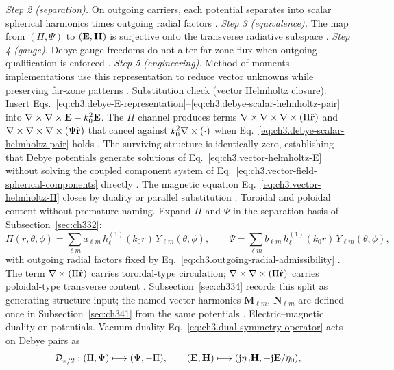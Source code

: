 \emph{Step 2 (separation).} On outgoing carriers, each potential separates into scalar spherical harmonics times outgoing radial factors .
\emph{Step 3 (equivalence).} The map from \((\Pi,\Psi)\) to \((\mathbf{E},\mathbf{H})\) is surjective onto the transverse radiative subspace .
\emph{Step 4 (gauge).} Debye gauge freedoms do not alter far-zone flux when outgoing qualification is enforced .
\emph{Step 5 (engineering).} Method-of-moments implementations use this representation to reduce vector unknowns while preserving far-zone patterns .
Substitution check (vector Helmholtz closure). Insert Eqs.~\eqref{eq:ch3.debye-E-representation}--\eqref{eq:ch3.debye-scalar-helmholtz-pair} into
\(\nabla\times\nabla\times\mathbf{E}-k_{0}^{2}\mathbf{E}\). The \(\Pi\) channel produces terms \(\nabla\times\nabla\times\nabla\times(\Pi\hat{\mathbf{r}})\) and
\(\nabla\times\nabla\times\nabla\times(\Psi\hat{\mathbf{r}})\) that cancel against \(k_{0}^{2}\nabla\times(\cdot)\) when
Eq.~\eqref{eq:ch3.debye-scalar-helmholtz-pair} holds . The surviving structure is
identically zero, establishing that Debye potentials generate solutions of
Eq.~\eqref{eq:ch3.vector-helmholtz-E} without solving the coupled component system of
Eq.~\eqref{eq:ch3.vector-field-spherical-components} directly . The magnetic equation
Eq.~\eqref{eq:ch3.vector-helmholtz-H} closes by duality or parallel substitution .
Toroidal and poloidal content without premature naming. Expand \(\Pi\) and \(\Psi\) in the separation basis of Subsection~\ref{sec:ch332}:
\begin{equation}
\label{eq:ch3.debye-separated-expansion}
\Pi(r,\theta,\phi)
=
\sum_{\ell m}a_{\ell m}\,h_{\ell}^{(1)}(k_{0}r)\,Y_{\ell m}(\theta,\phi),
\qquad
\Psi
=
\sum_{\ell m}b_{\ell m}\,h_{\ell}^{(1)}(k_{0}r)\,Y_{\ell m}(\theta,\phi),
\end{equation}
with outgoing radial factors fixed by Eq.~\eqref{eq:ch3.outgoing-radial-admissibility}
. The term \(\nabla\times(\Pi\hat{\mathbf{r}})\) carries toroidal-type circulation;
\(\nabla\times\nabla\times(\Pi\hat{\mathbf{r}})\) carries poloidal-type transverse content .
Subsection~\ref{sec:ch334} records this split as generating-structure input; the named vector harmonics
\(\mathbf{M}_{\ell m}\), \(\mathbf{N}_{\ell m}\) are defined once in Subsection~\ref{sec:ch341} from the same
potentials .
Electric--magnetic duality on potentials. Vacuum duality Eq.~\eqref{eq:ch3.dual-symmetry-operator} acts on Debye pairs as
\begin{equation}
\label{eq:ch3.debye-duality-exchange}
\mathcal{D}_{\pi/2}:
(\Pi,\Psi)\longmapsto(\Psi,-\Pi),
\qquad
(\mathbf{E},\mathbf{H})\longmapsto(\mathrm{j}\eta_{0}\mathbf{H},-\mathrm{j}\mathbf{E}/\eta_{0}),
\end{equation}
